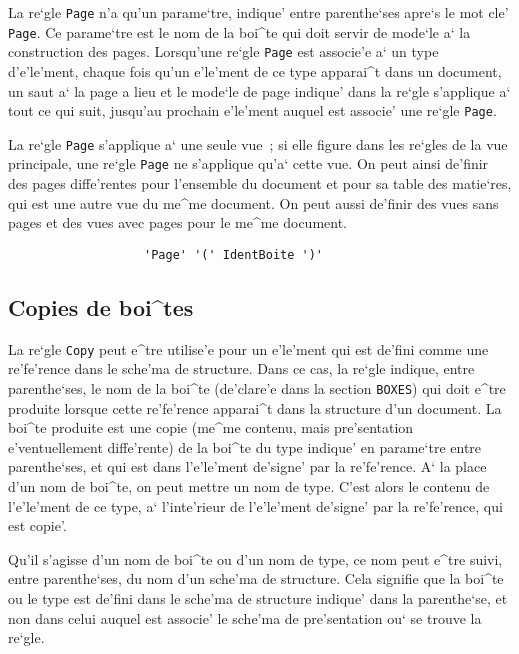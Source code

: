 {La re`gle {\tt Page} n'a qu'un parame`tre, indique' entre parenthe`ses apre`s le
mot cle' {\tt Page}. Ce parame`tre est le nom de la boi^te qui doit servir de
mode`le a` la construction des pages. Lorsqu'une re`gle {\tt Page} est associe'e
a` un type d'e'le'ment, chaque fois qu'un e'le'ment de ce type apparai^t dans un
document, un saut a` la page a lieu et le mode`le de page indique' dans la
re`gle s'applique a` tout ce qui suit, jusqu'au prochain e'le'ment auquel est
associe' une re`gle {\tt Page}.

La re`gle {\tt Page} s'applique a` une seule vue~; si elle figure dans
les re`gles de la vue principale, une re`gle {\tt Page} ne s'applique qu'a`
cette vue. On peut ainsi de'finir des pages diffe'rentes pour l'ensemble du
document et pour sa table des matie`res, qui est une autre vue du me^me
document. On peut aussi de'finir des vues sans pages et des vues avec pages
pour le me^me document.

\begin{verbatim}
                   'Page' '(' IdentBoite ')'
\end{verbatim}

\subsection{Copies de boi^tes}
\label{regleCopy}

La re`gle {\tt Copy} peut e^tre utilise'e pour un e'le'ment qui est de'fini
comme une re'fe'rence dans le sche'ma de structure. Dans ce cas, la re`gle
indique, entre parenthe`ses, le nom de la boi^te (de'clare'e dans la section
{\tt BOXES}) qui doit e^tre produite lorsque cette re'fe'rence apparai^t dans
la structure d'un document. La boi^te produite est une copie (me^me contenu,
mais pre'sentation e'ventuellement diffe'rente) de la boi^te du type indique'
en parame`tre entre parenthe`ses, et qui est dans l'e'le'ment de'signe' par
la re'fe'rence.
A` la place d'un nom de boi^te, on peut mettre un nom de type. C'est alors le
contenu de l'e'le'ment de ce type, a` l'inte'rieur de l'e'le'ment
de'signe' par la re'fe'rence, qui est copie'.

Qu'il s'agisse d'un nom de boi^te ou d'un nom de type, ce nom peut e^tre
suivi, entre parenthe`ses, du nom d'un sche'ma de structure. Cela signifie
que la boi^te ou le type est de'fini dans le sche'ma de structure indique'
dans la parenthe`se, et non dans celui auquel est associe' le sche'ma de
pre'sentation ou` se trouve la re`gle.

}
